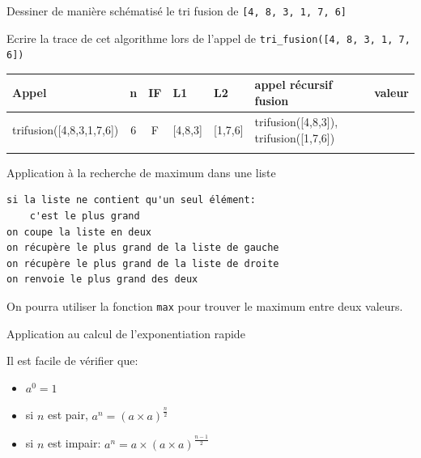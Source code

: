 \begin{exercice}{Dessiner de manière schématisé le tri fusion de \verb+[4, 8, 3, 1, 7, 6]+}{}


    \vspace{3cm}
\end{exercice}

\begin{exercice}{Ecrire la trace de cet algorithme lors de l'appel de \verb+tri_fusion([4, 8, 3, 1, 7, 6])+}{}

\begin{tabular}{|p{3.5cm}|c|c|p{}|p{}|p{6cm}|p{3cm}|}
    \hline
    Appel &n & IF & L1 & L2 & appel récursif fusion & valeur \\ \hline
    trifusion([4,8,3,1,7,6])&6&F&[4,8,3]&[1,7,6]&trifusion([4,8,3]), trifusion([1,7,6])& \\ \hline
    &&&&&& \\ \hline
    
\end{tabular}
\end{exercice}

    \begin{exercice}{Application à la recherche de maximum dans une liste}{}

        \begin{verbatim}
si la liste ne contient qu'un seul élément:
    c'est le plus grand
on coupe la liste en deux
on récupère le plus grand de la liste de gauche
on récupère le plus grand de la liste de droite
on renvoie le plus grand des deux
        \end{verbatim}
        
        On pourra utiliser la fonction \verb+max+ pour trouver le maximum entre deux valeurs.
        \end{exercice}

    \begin{exercice}{\quad }{}

        Application au calcul de l'exponentiation rapide
        
        Il est facile de vérifier que:
        
        \begin{itemize}
            \item $a^0=1$
            \item si $n$ est pair, $a^n=(a \times a)^{\frac{n}{2}}$
            \item si $n$ est impair: $a^n=a \times (a \times a)^{\frac{n-1}{2}}$
        \end{itemize}
             \end{exercice}



